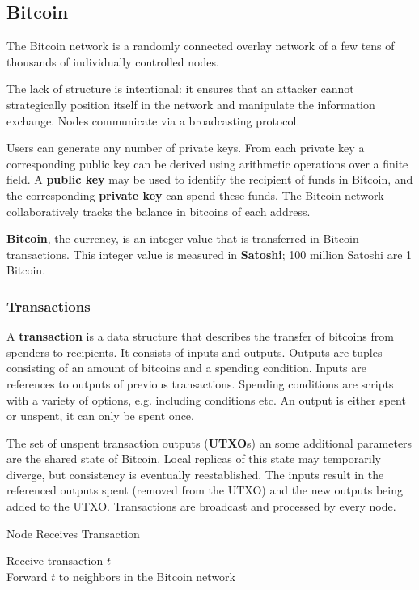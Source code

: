 \subsection{Bitcoin}

The Bitcoin network is a randomly connected overlay network of a few tens of thousands of individually controlled nodes. \medskip

The lack of structure is intentional: it ensures that an attacker cannot strategically position itself in the network and manipulate the information exchange. Nodes communicate via a broadcasting protocol. \medskip

Users can generate any number of private keys. From each private key a corresponding public key can be derived using arithmetic operations over a finite field. A \textbf{public key} may be used to identify the recipient of funds in Bitcoin, and the corresponding \textbf{private key} can spend these funds. The Bitcoin network collaboratively tracks the balance in bitcoins of each address. \medskip

\textbf{Bitcoin}, the currency, is an integer value that is transferred in Bitcoin transactions. This integer value is measured in \textbf{Satoshi}; 100 million Satoshi are 1 Bitcoin.

\subsubsection{Transactions}

A \textbf{transaction} is a data structure that describes the transfer of bitcoins from spenders to recipients. It consists of inputs and outputs. Outputs are tuples consisting of an amount of bitcoins and a spending condition. Inputs are references to outputs of previous transactions. Spending conditions are scripts with a variety of options, e.g. including conditions etc. An output is either spent or unspent, it can only be spent once. \medskip

The set of unspent transaction outputs (\textbf{UTXO}s) an some additional parameters are the shared state of Bitcoin. Local replicas of this state may temporarily diverge, but consistency is eventually reestablished. The inputs result in the referenced outputs spent (removed from the UTXO) and the new outputs being added to the UTXO. Transactions are broadcast and processed by every node.\medskip

\begin{algorithm}[H]
\caption{Node Receives Transaction}
	Receive transaction $t$\\
	Forward $t$ to neighbors in the Bitcoin network
\end{algorithm}
\medskip

